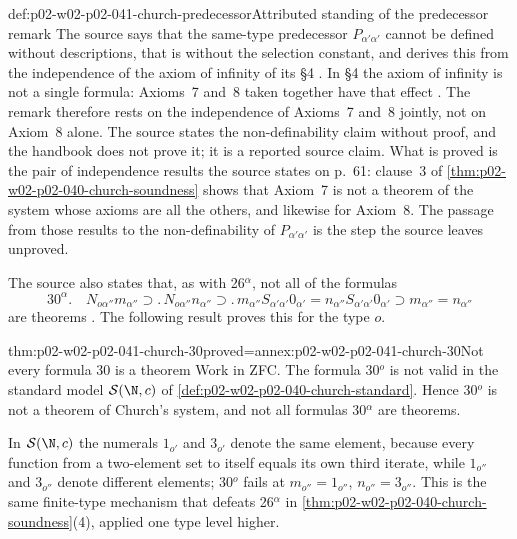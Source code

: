 \begin{hbwarning}{def:p02-w02-p02-041-church-predecessor}{Attributed standing of the predecessor remark}
The source says that the same-type predecessor \(P_{\alpha'\alpha'}\) cannot
be defined without descriptions, that is without the selection constant, and
derives this from the independence of the axiom of infinity of its \S4
\cite[\S2, p.~59]{Church1940}.  In \S4 the axiom of infinity is not a single
formula: Axioms~7 and~8 taken together have that effect
\cite[\S4, p.~61]{Church1940}.  The remark therefore rests on the independence
of Axioms~7 and~8 jointly, not on Axiom~8 alone.  The source states
the non-definability claim without proof, and the handbook does not prove it;
it is a reported source claim.  What is proved is the pair of independence
results the source states on p.~61: clause~3 of
\cref{thm:p02-w02-p02-040-church-soundness} shows that Axiom~7 is not a
theorem of the system whose axioms are all the others, and likewise for
Axiom~8.  The passage from those results to the non-definability of
\(P_{\alpha'\alpha'}\) is the step the source leaves unproved.
\end{hbwarning}

The source also states that, as with 26\(^\alpha\), not all of the formulas
\[
 30^\alpha.\quad N_{o\alpha''}m_{\alpha''}\supset.\,N_{o\alpha''}n_{\alpha''}\supset.\,
 m_{\alpha''}S_{\alpha'\alpha'}0_{\alpha'}=n_{\alpha''}S_{\alpha'\alpha'}0_{\alpha'}
 \supset m_{\alpha''}=n_{\alpha''}
\]
are theorems \cite[\S6, p.~66]{Church1940}.  The following result proves this
for the type \(o\).

\begin{hbtheorem}{thm:p02-w02-p02-041-church-30}{proved=annex:p02-w02-p02-041-church-30}{Not every formula 30 is a theorem}
Work in ZFC.  The formula 30\(^o\) is not valid in the standard model
\(\mathcal S(\N,c)\) of \cref{def:p02-w02-p02-040-church-standard}.  Hence
30\(^o\) is not a theorem of Church's system, and not all formulas
30\(^\alpha\) are theorems.
\end{hbtheorem}

In \(\mathcal S(\N,c)\) the numerals \(1_{o'}\) and \(3_{o'}\) denote the same
element, because every function from a two-element set to itself equals its
own third iterate, while \(1_{o''}\) and \(3_{o''}\) denote different elements;
30\(^o\) fails at \(m_{o''}=1_{o''}\), \(n_{o''}=3_{o''}\).  This is the same
finite-type mechanism that defeats 26\(^\alpha\) in
\cref{thm:p02-w02-p02-040-church-soundness}(4), applied one type level higher.
